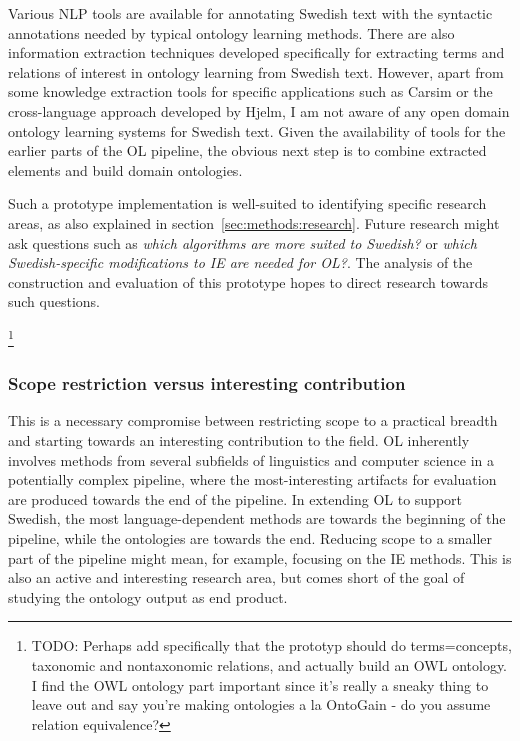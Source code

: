 \documentclass[a4paper]{report}
\newcommand{\todo}[1]{\footnote{{\color{red} TODO: #1}}}
\begin{document}
Various NLP tools are available for annotating Swedish text with the syntactic annotations needed by typical ontology learning methods.
There are also information extraction techniques developed specifically for extracting terms and relations of interest in ontology learning\cite{Kokkinakis08SolidComp} from Swedish text.
However, apart from some knowledge extraction tools for specific applications such as Carsim\cite{JohanssonEtAll04Carsim} or the cross-language approach developed by Hjelm\cite{Hjelm09Thesis}, I am not aware of any open domain ontology learning systems for Swedish text.
Given the availability of tools for the earlier parts of the OL pipeline, the obvious next step is to combine extracted elements and build domain ontologies.

Such a prototype implementation is well-suited to identifying specific research areas, as also explained in section~\ref{sec:methods:research}.
Future research might ask questions such as \emph{which algorithms are more suited to Swedish?} or \emph{which Swedish-specific modifications to IE are needed for OL?}.
The analysis of the construction and evaluation of this prototype hopes to direct research towards such questions.

\todo{Perhaps add specifically that the prototyp should do terms=concepts, taxonomic and nontaxonomic relations, and actually build an OWL ontology. I find the OWL ontology part important since it's really a sneaky thing to leave out and say you're making ontologies a la OntoGain - do you assume relation equivalence?}

\subsubsection{Scope restriction versus interesting contribution}

This is a necessary compromise between restricting scope to a practical breadth and starting towards an interesting contribution to the field.
OL inherently involves methods from several subfields of linguistics and computer science in a potentially complex pipeline, where the most-interesting artifacts for evaluation are produced towards the end of the pipeline.
In extending OL to support Swedish, the most language-dependent methods are towards the beginning of the pipeline, while the ontologies are towards the end.
Reducing scope to a smaller part of the pipeline might mean, for example, focusing on the IE methods.
This is also an active and interesting research area, but comes short of the goal of studying the ontology output as end product.
\end{document}
